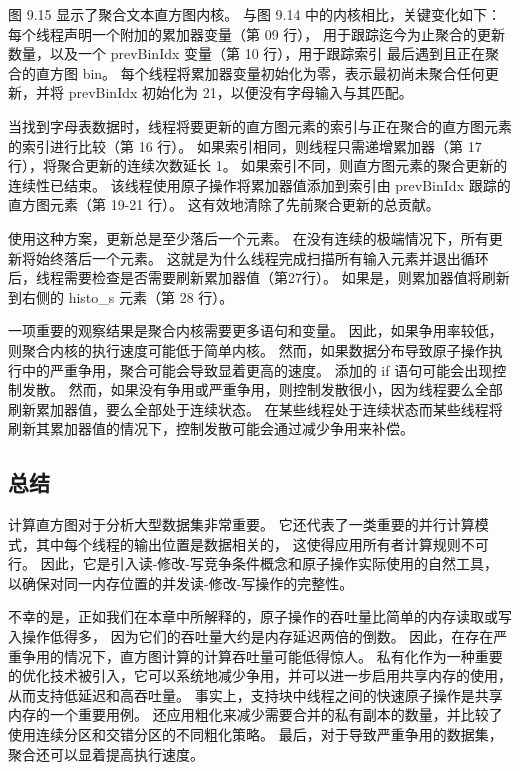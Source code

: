 图 9.15 显示了聚合文本直方图内核。 与图 9.14 中的内核相比，关键变化如下：每个线程声明一个附加的累加器变量（第 09 行），
用于跟踪迄今为止聚合的更新数量，以及一个 prevBinIdx 变量（第 10 行），用于跟踪索引 最后遇到且正在聚合的直方图 bin。 
每个线程将累加器变量初始化为零，表示最初尚未聚合任何更新，并将 prevBinIdx 初始化为 21，以便没有字母输入与其匹配。

当找到字母表数据时，线程将要更新的直方图元素的索引与正在聚合的直方图元素的索引进行比较（第 16 行）。 
如果索引相同，则线程只需递增累加器（第 17 行），将聚合更新的连续次数延长 1。 
如果索引不同，则直方图元素的聚合更新的连续性已结束。 
该线程使用原子操作将累加器值添加到索引由 prevBinIdx 跟踪的直方图元素（第 19-21 行）。 这有效地清除了先前聚合更新的总贡献。

使用这种方案，更新总是至少落后一个元素。 在没有连续的极端情况下，所有更新将始终落后一个元素。 
这就是为什么线程完成扫描所有输入元素并退出循环后，线程需要检查是否需要刷新累加器值（第27行）。 
如果是，则累加器值将刷新到右侧的 histo\_s 元素（第 28 行）。

一项重要的观察结果是聚合内核需要更多语句和变量。 因此，如果争用率较低，则聚合内核的执行速度可能低于简单内核。 
然而，如果数据分布导致原子操作执行中的严重争用，聚合可能会导致显着更高的速度。 添加的 if 语句可能会出现控制发散。 
然而，如果没有争用或严重争用，则控制发散很小，因为线程要么全部刷新累加器值，要么全部处于连续状态。 
在某些线程处于连续状态而某些线程将刷新其累加器值的情况下，控制发散可能会通过减少争用来补偿。

\subsection{总结}
计算直方图对于分析大型数据集非常重要。 它还代表了一类重要的并行计算模式，其中每个线程的输出位置是数据相关的，
这使得应用所有者计算规则不可行。 因此，它是引入读-修改-写竞争条件概念和原子操作实际使用的自然工具，
以确保对同一内存位置的并发读-修改-写操作的完整性。

不幸的是，正如我们在本章中所解释的，原子操作的吞吐量比简单的内存读取或写入操作低得多，
因为它们的吞吐量大约是内存延迟两倍的倒数。 因此，在存在严重争用的情况下，直方图计算的计算吞吐量可能低得惊人。 
私有化作为一种重要的优化技术被引入，它可以系统地减少争用，并可以进一步启用共享内存的使用，从而支持低延迟和高吞吐量。 
事实上，支持块中线程之间的快速原子操作是共享内存的一个重要用例。 
还应用粗化来减少需要合并的私有副本的数量，并比较了使用连续分区和交错分区的不同粗化策略。 
最后，对于导致严重争用的数据集，聚合还可以显着提高执行速度。
